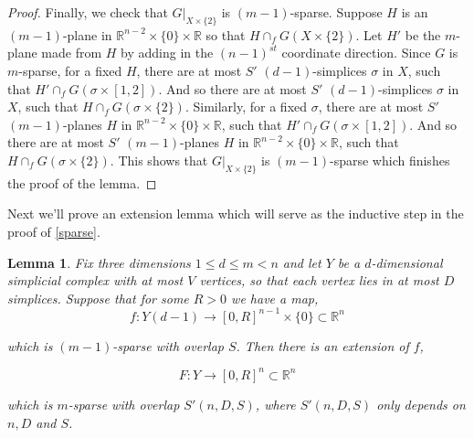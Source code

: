 \documentclass[12pt]{article}
\newtheorem{lemma}{Lemma}
\newcommand{\RR}{\mathbb{R}}
\begin{document}
\begin{proof}
		Finally, we check that $G|_{X \times \{2\}}$ is $(m-1)$-sparse. Suppose $H$ is an $(m-1)$-plane in $\RR^{n-2} \times \{0\} \times \RR$ so that $H \cap_f G(X \times \{2\})$. Let $H'$ be the $m$-plane made from $H$ by adding in the $(n-1)^{st}$ coordinate direction. Since $G$ is $m$-sparse, for a fixed $H$, there are at most $S'$ $(d-1)$-simplices $\sigma$ in $X$, such that $H' \cap_f G(\sigma \times [1,2])$. And so there are at most $S'$ $(d-1)$-simplices $\sigma$ in $X$, such that $H \cap_f G(\sigma \times \{2\})$. Similarly, for a fixed $\sigma$, there are at most $S'$ $(m-1)$-planes $H$ in $\RR^{n-2} \times \{0\} \times \RR$, such that $H' \cap_f G(\sigma \times [1,2])$. And so there are at most $S'$ $(m-1)$-planes $H$ in $\RR^{n-2} \times \{0\} \times \RR$, such that $H \cap_f G(\sigma \times \{2\})$.  This shows that $G|_{X \times \{2\}}$ is $(m-1)$-sparse which finishes the proof of the lemma.
	\end{proof}
	
	Next we'll prove an extension lemma which will serve as the inductive step in the proof of \cref{sparse}.
	
	\begin{lemma} \label{extension} Fix three dimensions $1 \le d \le m < n$ and let $Y$ be a $d$-dimensional simplicial complex with at most $V$ vertices, so that each vertex lies in at most $D$ simplices. Suppose that for some $R>0$ we have a map,
		$$f: Y(d-1) \to [0, R]^{n-1} \times \{0\} \subset \RR^{n}$$
		
		\noindent which is $(m-1)$-sparse with overlap $S$. Then there is an extension of $f$,
		
		$$F: Y \to [0, R]^n  \subset \RR^{n}$$
		
		\noindent which is $m$-sparse with overlap $S'(n,D,S)$, where $S'(n,D,S)$ only depends on $n, D$ and $S$.
	\end{lemma}
	
\end{document}
